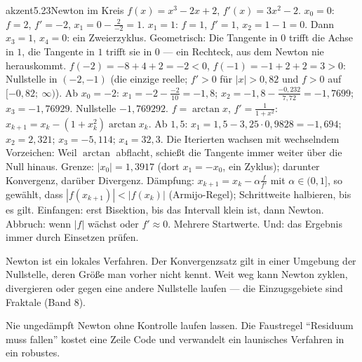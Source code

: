\begin{loesungkarte}{akzent}{5.23}{Newton im Kreis}
$f(x) = x^{3} - 2x + 2$, $f'(x) = 3x^{2} - 2$. $x_0 = 0$: $f = 2$, $f' = -2$, $x_1 = 0 - \frac2{-2} = 1$. $x_1 = 1$: $f = 1$, $f' = 1$, $x_2 = 1 - 1 = 0$. Dann $x_3 = 1$, $x_4 = 0$: ein Zweierzyklus. Geometrisch: Die Tangente in $0$ trifft die Achse in $1$, die Tangente in $1$ trifft sie in $0$ --- ein Rechteck, aus dem Newton nie herauskommt.
$f(-2) = -8 + 4 + 2 = -2 < 0$, $f(-1) = -1 + 2 + 2 = 3 > 0$: Nullstelle in $(-2, -1)$ (die einzige reelle; $f' > 0$ für $|x| > 0{,}82$ und $f > 0$ auf $[-0{,}82;\ \infty)$). Ab $x_0 = -2$: $x_1 = -2 - \frac{-2}{10} = -1{,}8$; $x_2 = -1{,}8 - \frac{-0{,}232}{7{,}72} = -1{,}7699$; $x_3 = -1{,}76929$. Nullstelle $-1{,}769292$.
$f = \arctan x$, $f' = \frac1{1 + x^{2}}$: $x_{k+1} = x_k - (1 + x_k^{2})\arctan x_k$. Ab $1{,}5$: $x_1 = 1{,}5 - 3{,}25\cdot0{,}9828 = -1{,}694$; $x_2 = 2{,}321$; $x_3 = -5{,}114$; $x_4 = 32{,}3$. Die Iterierten wachsen mit wechselndem Vorzeichen: Weil $\arctan$ abflacht, schießt die Tangente immer weiter über die Null hinaus. Grenze: $|x_0| = 1{,}3917$ (dort $x_1 = -x_0$, ein Zyklus); darunter Konvergenz, darüber Divergenz.
Dämpfung: $x_{k+1} = x_k - \alpha\frac{f}{f'}$ mit $\alpha\in(0, 1]$, so gewählt, dass $|f(x_{k+1})| < |f(x_k)|$ (Armijo-Regel); Schrittweite halbieren, bis es gilt. Einfangen: erst Bisektion, bis das Intervall klein ist, dann Newton. Abbruch: wenn $|f|$ wächst oder $f'\approx0$. Mehrere Startwerte. Und: das Ergebnis immer durch Einsetzen prüfen.
\begin{fehler}\kastentext
Newton ist ein lokales Verfahren. Der Konvergenzsatz gilt in einer Umgebung der Nullstelle, deren Größe man vorher nicht kennt. Weit weg kann Newton zyklen, divergieren oder gegen eine andere Nullstelle laufen --- die Einzugsgebiete sind Fraktale (Band 8).
\end{fehler}
\begin{mitnehmen}\kastentext
Nie ungedämpft Newton ohne Kontrolle laufen lassen. Die Faustregel \enquote{Residuum muss fallen} kostet eine Zeile Code und verwandelt ein launisches Verfahren in ein robustes.
\end{mitnehmen}
\end{loesungkarte}

